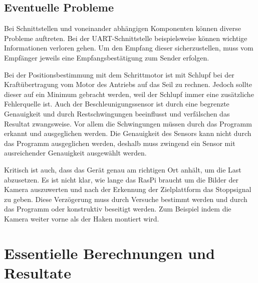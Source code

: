 \documentclass[a4paper]{report}
\begin{document}
\subsection{Eventuelle Probleme}
\label{ssec:EvtlProb}
Bei Schnittstellen und voneinander abhängigen Komponenten können diverse Probleme auftreten. Bei der UART-Schnittstelle beispielsweise können wichtige Informationen verloren gehen. Um den Empfang dieser sicherzustellen, muss vom Empfänger jeweils eine Empfangsbestätigung zum Sender erfolgen.

Bei der Positionsbestimmung mit dem Schrittmotor ist mit Schlupf bei der Kraft\-übertragung vom Motor des Antriebs auf das Seil zu rechnen. Jedoch sollte dieser auf ein Minimum gebracht werden, weil der Schlupf immer eine zusätzliche Fehlerquelle ist. Auch der Beschleunigungssensor ist durch eine begrenzte Genauigkeit und durch Restschwingungen beeinflusst und verfälschen das Resultat zwangsweise. Vor allem die Schwingungen müssen durch das Programm erkannt und ausgeglichen werden. Die Genauigkeit des Sensors kann nicht durch das Programm ausgeglichen werden, deshalb muss zwingend ein Sensor mit ausreichender Genauigkeit ausgewählt werden.

Kritisch ist auch, dass das Gerät genau am richtigen Ort anhält, um die Last abzusetzen. Es ist nicht klar, wie lange das RasPi braucht um die Bilder der Kamera auszuwerten und nach der Erkennung der Zielplattform das Stoppsignal zu geben. Diese Verzögerung muss durch Versuche bestimmt werden und durch das Programm oder konstruktiv beseitigt werden. Zum Beispiel indem die Kamera weiter vorne als der Haken montiert wird.

\section{Essentielle Berechnungen und Resultate}
\label{sec:EssBerechnung}
\end{document}
